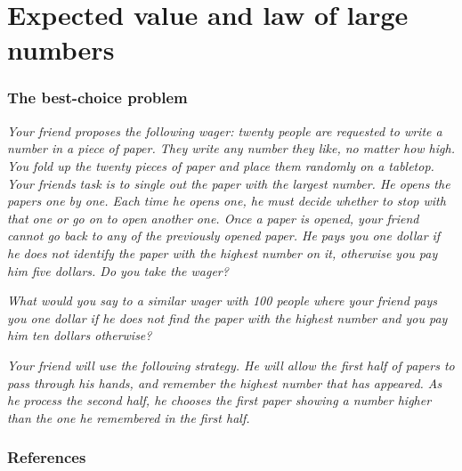 \section{Expected value and law of large numbers}

\begin{frame}
    \frametitle{The best-choice problem}

    \footnotesize
    \hfill\citet{tijms12}

    \textit{
        Your friend proposes the following wager: twenty people are requested
        to write a number in a piece of paper. They write any number they like,
        no matter how high. You fold up the twenty pieces of paper and place
        them randomly on a tabletop.
        Your friends task is to single out the paper with the largest number.
        He opens the papers one by one. Each time he opens one, he must decide
        whether to stop with that one or go on to open another one. Once a
        paper is opened, your friend cannot go back to any of the previously
        opened paper.
        He pays you one dollar if he does not identify the paper with the
        highest number on it, otherwise you pay him five dollars. Do you take
        the wager?  }

    \textit{
        What would you say to a similar wager with 100 people where your friend
        pays you one dollar if he does not find the paper with the highest
        number and you pay him ten dollars otherwise?
    }
        
    \textit{ 
        Your friend will use the following strategy. He will allow the first half
        of papers to pass through his hands, and remember the highest number that
        has appeared. As he process the second half, he chooses the first paper
        showing a number higher than the one he remembered in the first half.
    }

\end{frame}

\begin{frame}
    \frametitle{References}

    \tiny{
        
        
    }
\end{frame}



